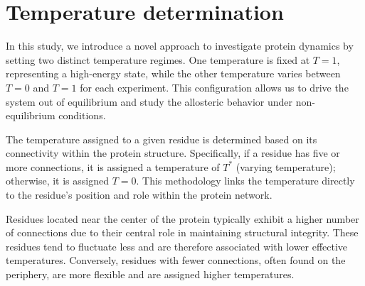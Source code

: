 \documentclass[English, Lau, oneside]{sapthesis}
\begin{document}
\newpage
\section{Temperature determination}
In this study, we introduce a novel approach to investigate protein dynamics by setting two distinct temperature regimes. One temperature is fixed at \( T = 1 \), representing a high-energy state, while the other temperature varies between \( T = 0 \) and \( T = 1 \) for each experiment. This configuration allows us to drive the system out of equilibrium and study the allosteric behavior under non-equilibrium conditions.

The temperature assigned to a given residue is determined based on its connectivity within the protein structure. Specifically, if a residue has five or more connections, it is assigned a temperature of \( T^* \) (varying temperature); otherwise, it is assigned \( T = 0 \). This methodology links the temperature directly to the residue's position and role within the protein network.

Residues located near the center of the protein typically exhibit a higher number of connections due to their central role in maintaining structural integrity. These residues tend to fluctuate less and are therefore associated with lower effective temperatures. Conversely, residues with fewer connections, often found on the periphery, are more flexible and are assigned higher temperatures.
\end{document}

